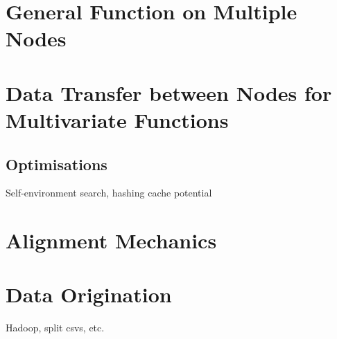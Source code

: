 \documentclass[a4paper,10pt]{article}
\begin{document}
\section{General Function on Multiple Nodes}
\section{Data Transfer between Nodes for Multivariate Functions}
\subsection{Optimisations}
Self-environment search, hashing cache potential
\section{Alignment Mechanics}
\section{Data Origination}
Hadoop, split csvs, etc.














\end{document}
